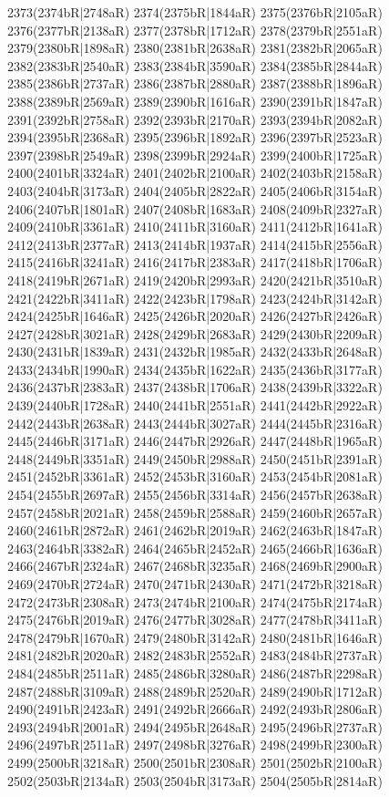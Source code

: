 2373(2374bR|2748aR) 2374(2375bR|1844aR) 2375(2376bR|2105aR) \\2376(2377bR|2138aR) 2377(2378bR|1712aR) 2378(2379bR|2551aR) 2379(2380bR|1898aR) 2380(2381bR|2638aR) 2381(2382bR|2065aR) 2382(2383bR|2540aR) 2383(2384bR|3590aR) 2384(2385bR|2844aR) \\2385(2386bR|2737aR) 2386(2387bR|2880aR) 2387(2388bR|1896aR) 2388(2389bR|2569aR) 2389(2390bR|1616aR) 2390(2391bR|1847aR) 2391(2392bR|2758aR) 2392(2393bR|2170aR) 2393(2394bR|2082aR) \\2394(2395bR|2368aR) 2395(2396bR|1892aR) 2396(2397bR|2523aR) 2397(2398bR|2549aR) 2398(2399bR|2924aR) 2399(2400bR|1725aR) 2400(2401bR|3324aR) 2401(2402bR|2100aR) 2402(2403bR|2158aR) \\2403(2404bR|3173aR) 2404(2405bR|2822aR) 2405(2406bR|3154aR) 2406(2407bR|1801aR) 2407(2408bR|1683aR) 2408(2409bR|2327aR) 2409(2410bR|3361aR) 2410(2411bR|3160aR) 2411(2412bR|1641aR) \\2412(2413bR|2377aR) 2413(2414bR|1937aR) 2414(2415bR|2556aR) 2415(2416bR|3241aR) 2416(2417bR|2383aR) 2417(2418bR|1706aR) 2418(2419bR|2671aR) 2419(2420bR|2993aR) 2420(2421bR|3510aR) \\2421(2422bR|3411aR) 2422(2423bR|1798aR) 2423(2424bR|3142aR) 2424(2425bR|1646aR) 2425(2426bR|2020aR) 2426(2427bR|2426aR) 2427(2428bR|3021aR) 2428(2429bR|2683aR) 2429(2430bR|2209aR) \\2430(2431bR|1839aR) 2431(2432bR|1985aR) 2432(2433bR|2648aR) 2433(2434bR|1990aR) 2434(2435bR|1622aR) 2435(2436bR|3177aR) 2436(2437bR|2383aR) 2437(2438bR|1706aR) 2438(2439bR|3322aR) \\2439(2440bR|1728aR) 2440(2441bR|2551aR) 2441(2442bR|2922aR) 2442(2443bR|2638aR) 2443(2444bR|3027aR) 2444(2445bR|2316aR) 2445(2446bR|3171aR) 2446(2447bR|2926aR) 2447(2448bR|1965aR) \\2448(2449bR|3351aR) 2449(2450bR|2988aR) 2450(2451bR|2391aR) 2451(2452bR|3361aR) 2452(2453bR|3160aR) 2453(2454bR|2081aR) 2454(2455bR|2697aR) 2455(2456bR|3314aR) 2456(2457bR|2638aR) \\2457(2458bR|2021aR) 2458(2459bR|2588aR) 2459(2460bR|2657aR) 2460(2461bR|2872aR) 2461(2462bR|2019aR) 2462(2463bR|1847aR) 2463(2464bR|3382aR) 2464(2465bR|2452aR) 2465(2466bR|1636aR) \\2466(2467bR|2324aR) 2467(2468bR|3235aR) 2468(2469bR|2900aR) 2469(2470bR|2724aR) 2470(2471bR|2430aR) 2471(2472bR|3218aR) 2472(2473bR|2308aR) 2473(2474bR|2100aR) 2474(2475bR|2174aR) \\2475(2476bR|2019aR) 2476(2477bR|3028aR) 2477(2478bR|3411aR) 2478(2479bR|1670aR) 2479(2480bR|3142aR) 2480(2481bR|1646aR) 2481(2482bR|2020aR) 2482(2483bR|2552aR) 2483(2484bR|2737aR) \\2484(2485bR|2511aR) 2485(2486bR|3280aR) 2486(2487bR|2298aR) 2487(2488bR|3109aR) 2488(2489bR|2520aR) 2489(2490bR|1712aR) 2490(2491bR|2423aR) 2491(2492bR|2666aR) 2492(2493bR|2806aR) \\2493(2494bR|2001aR) 2494(2495bR|2648aR) 2495(2496bR|2737aR) 2496(2497bR|2511aR) 2497(2498bR|3276aR) 2498(2499bR|2300aR) 2499(2500bR|3218aR) 2500(2501bR|2308aR) 2501(2502bR|2100aR) \\2502(2503bR|2134aR) 2503(2504bR|3173aR) 2504(2505bR|2814aR) 